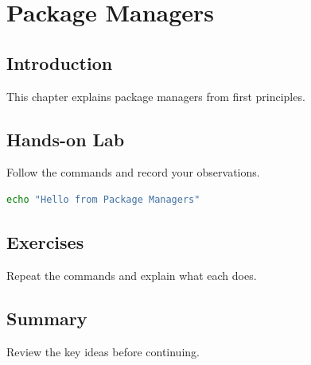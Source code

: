 \chapter{Package Managers}
\label{vol2chap4}



\section{Introduction}
This chapter explains package managers from first principles.

\section{Hands-on Lab}
Follow the commands and record your observations.

\begin{lstlisting}[language=bash]
echo "Hello from Package Managers"
\end{lstlisting}

\section{Exercises}
\begin{exercise}
Repeat the commands and explain what each does.
\end{exercise}

\section{Summary}
Review the key ideas before continuing.
